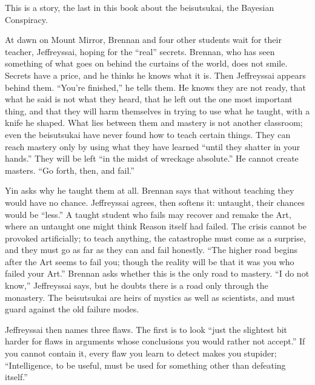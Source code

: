
This is a story, the last in this book about the beisutsukai, the Bayesian Conspiracy. 

At dawn on Mount Mirror, Brennan and four other students wait for their teacher, Jeffreyssai, hoping for the ``real'' secrets. Brennan, who has seen something of what goes on behind the curtains of the world, does not smile. Secrets have a price, and he thinks he knows what it is. Then Jeffreyssai appears behind them. ``You're finished,'' he tells them. He knows they are not ready, that what he said is not what they heard, that he left out the one most important thing, and that they will harm themselves in trying to use what he taught, with a knife he shaped. What lies between them and mastery is not another classroom; even the beisutsukai have never found how to teach certain things. They can reach mastery only by using what they have learned ``until they shatter in your hands.'' They will be left ``in the midst of wreckage absolute.'' He cannot create masters. ``Go forth, then, and fail.''

Yin asks why he taught them at all. Brennan says that without teaching they would have no chance. Jeffreyssai agrees, then softens it: untaught, their chances would be ``less.'' A taught student who fails may recover and remake the Art, where an untaught one might think Reason itself had failed. The crisis cannot be provoked artificially; to teach anything, the catastrophe must come as a surprise, and they must go as far as they can and fail honestly. ``The higher road begins after the Art seems to fail you; though the reality will be that it was you who failed your Art.''  Brennan asks whether this is the only road to mastery. ``I do not know,'' Jeffreyssai says, but he doubts there is a road only through the monastery. The beisutsukai are heirs of mystics as well as scientists, and must guard against the old failure modes.

Jeffreyssai then names three flaws. The first is to look ``just the slightest bit harder for flaws in arguments whose conclusions you would rather not accept.'' If you cannot contain it, every flaw you learn to detect makes you stupider; ``Intelligence, to be useful, must be used for something other than defeating itself.''

